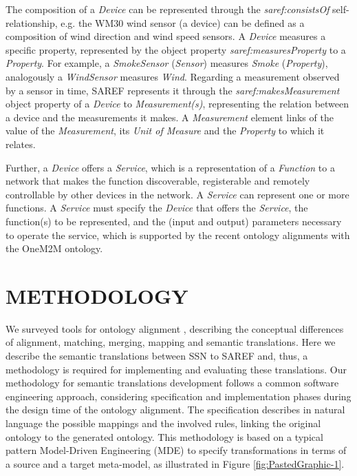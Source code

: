 \documentclass{sig-alternate-05-2015}
\begin{document}
The composition of a \textit{Device} can be represented through the \textit{saref:\-consistsOf} self-relationship, e.g. the WM30 wind sensor (a device) can be defined as a composition of wind direction and wind speed sensors. A \textit{Device} measures a specific property, represented by the object property \textit{saref:\-measuresProperty} to a \textit{Property}. For example, a \textit{SmokeSensor} (\textit{Sensor}) measures \textit{Smoke} (\textit{Property}), analogously a \textit{WindSensor} measures \textit{Wind}. Regarding a measurement observed by a sensor in time, SAREF represents it through the \textit{saref:\-makesMeasurement} object property of a \textit{Device} to \textit{Measurement(s)}, representing the relation between a device and the measurements it makes. A \textit{Measurement} element links of the value of the \textit{Measurement}, its \textit{Unit of Measure} and the \textit{Property} to which it relates. 

Further, a \textit{Device} offers a \textit{Service}, which is a representation of a \textit{Function} to a network that makes the function discoverable, registerable and remotely controllable by other devices in the network. A \textit{Service} can represent one or more functions. A \textit{Service} must specify the \textit{Device} that offers the \textit{Service}, the function(s) to be represented, and the (input and output) parameters necessary to operate the service, which is supported by the recent ontology alignments with the OneM2M ontology.


\section{METHODOLOGY}
We surveyed tools for ontology alignment \cite{Ganzha2015}, describing the conceptual differences of alignment, matching, merging, mapping and semantic translations. Here we describe the semantic translations between SSN to SAREF and, thus, a methodology is required for implementing and evaluating these translations. Our methodology for semantic translations development follows a common software engineering approach, considering specification and implementation phases during the design time of the ontology alignment. The specification describes in natural language the possible mappings and the involved rules, linking the original ontology to the generated ontology. This methodology is based on a typical pattern Model-Driven Engineering (MDE) \cite{Brambilla2012} to specify transformations in terms of a source and a target meta-model, as illustrated in Figure \ref{fig:PastedGraphic-1}.
\end{document}

